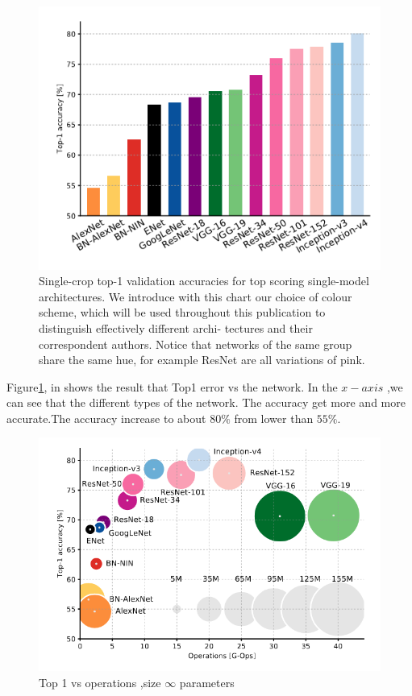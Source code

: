 \documentclass[10pt,twocolumn,letterpaper]{article}
\begin{document}
\begin{figure}[htbp]
	\centering
	\includegraphics[width=0.8\linewidth]{Pic/16.png}
	\caption{Single-crop top-1 validation accuracies for top scoring single-model architectures.  We introduce with this chart our choice of
		colour  scheme,  which  will  be  used  throughout  this
		publication to distinguish effectively different archi-
		tectures and their correspondent authors.  Notice that
		networks of the same group share the same hue, for
		example ResNet are all variations of pink.}\label{fig:dkhgigit}
\end{figure}

Figure\ref{fig:dkhgigit}, in \cite{canziani2016an} shows the result that Top1 error vs the  network. In the $x-axis$ ,we can see that the different types of the network. The accuracy get more and more accurate.The accuracy increase to about $80\%$ from lower than $55\%$. 


\begin{figure}[htbp]
	\centering
	\includegraphics[width=0.8\linewidth]{Pic/17.png}
	\caption{Top 1 vs operations ,size $\infty$ parameters }\label{fig:dkgmhhgigit}
\end{figure}
\end{document}
